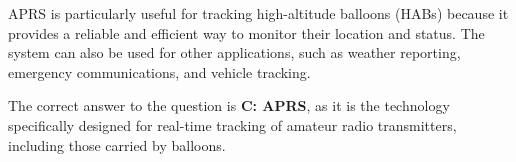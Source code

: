 APRS is particularly useful for tracking high-altitude balloons (HABs) because it provides a reliable and efficient way to monitor their location and status. The system can also be used for other applications, such as weather reporting, emergency communications, and vehicle tracking.

The correct answer to the question is \textbf{C: APRS}, as it is the technology specifically designed for real-time tracking of amateur radio transmitters, including those carried by balloons.

